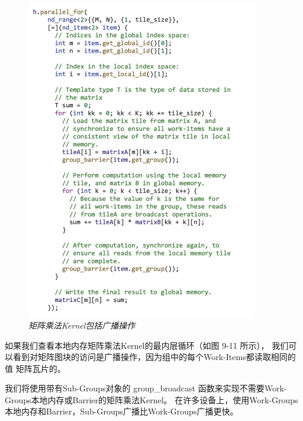 \begin{figure}[H]
	\centering
	\includegraphics[width=0.9\textwidth]{figs/F9.11.png}
	\caption{\textit{矩阵乘法Kernel包括广播操作 }}
\end{figure}

如果我们查看本地内存矩阵乘法Kernel的最内层循环（如图 9-11 所示），
我们可以看到对矩阵图块的访问是广播操作，因为组中的每个Work-Items都读取相同的值 矩阵瓦片的。

我们将使用带有Sub-Groups对象的 group\_broadcast 函数来实现不需要Work-Groups本地内存或Barrier的矩阵乘法Kernel。 
在许多设备上，使用Work-Groups本地内存和Barrier，Sub-Groups广播比Work-Groups广播更快。

